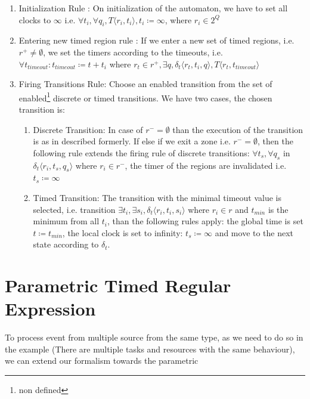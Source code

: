 			\begin{enumerate}
				\item Initialization Rule : On initialization of the automaton, we have to set all clocks to $\infty$ 
				i.e. $\forall t_i, \forall q_i, T \langle r_i, t_i \rangle, t_i \coloneqq \infty $, where $r_i \in 2^Q$
			
				\item Entering new timed region rule :
				If we enter a new set of timed regions, 
				i.e. $r^+ \neq \emptyset$, 
				we set the timers according to the timeouts, 
				i.e. $\forall t_{timeout} : t_{timeout} \coloneqq t + t_i $ where $ r_t \in r^+, \exists q ,\delta_t\langle  r_t,t_i,q \rangle, T \langle r_t, t_{timeout} \rangle$
				
				\item Firing Transitions Rule: Choose an enabled transition from the set of enabled\footnote{non defined} discrete or timed transitions. 
				We have two cases, the chosen transition is:
					\begin{enumerate}
						\item Discrete Transition: In case of $r^- = \emptyset$ than the execution of the transition is as in described formerly. 
							If else if we exit a zone i.e. $r^- = \emptyset$, 
							then the following rule extends the firing rule of discrete transitions:
							$\forall t_s, \forall q_s$ in $ \delta_t \langle r_i, t_s, q_s \rangle$ where $r_i \in r^-$, the timer of the regions are invalidated i.e.
							$t_s \coloneqq \infty$
						\item Timed Transition: The transition with the minimal timeout value is selected, 
							 i.e. transition $\exists t_i, \exists s_i, \delta_t \langle r_i, t_i, s_i \rangle$ where $ r_i \in r$ and $t_{min}$ is the minimum from all $t_i$,
							 than the following rules apply:
							 the global time is set $t \coloneqq t_{min}$, the local clock is set to infinity: $t_s \coloneqq \infty$ and move to the next state according to $\delta_t$.
					\end{enumerate}			
			\end{enumerate}


		
	\section{Parametric Timed Regular Expression}
		To process event from multiple source from the same type, as we need to do so in the example (There are multiple tasks and resources with the same behaviour),
		we can extend our formalism towards the parametric 
		
